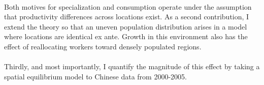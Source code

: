 \documentclass[]{article}
\begin{document}
\paragraph*{}  

 Both motives for specialization and consumption operate under the assumption that productivity differences across locations exist. As a second contribution, I extend the theory so that an uneven population distribution arises in a model where locations are identical ex ante. Growth in this environment also has the effect of reallocating workers toward densely populated regions.
 
 \paragraph*{}
 Thirdly, and most importantly, I quantify the magnitude of this effect by taking a spatial equilibrium model to Chinese data from 2000-2005. 


\newpage

\end{document}
